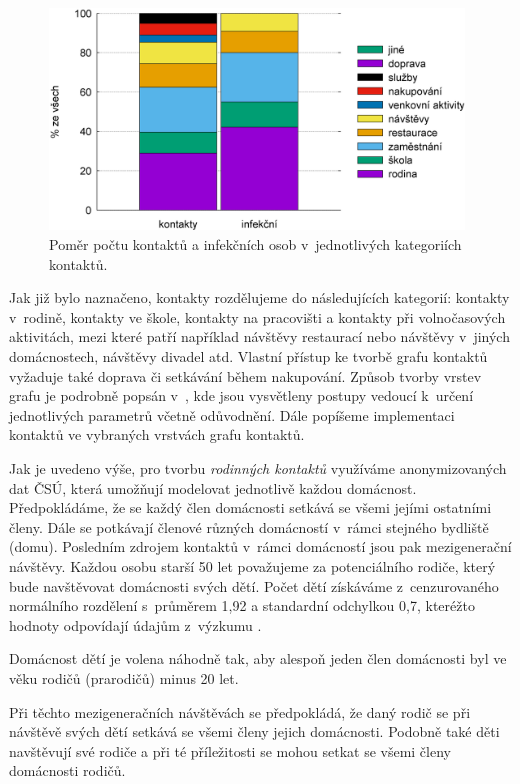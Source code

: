 \begin{figure}
    \centering
    \includegraphics[width=11cm]{pic/filled_cz.eps}
    \caption{Poměr počtu kontaktů a infekčních osob v~jednotlivých kategoriích kontaktů.}
    \label{kategorie}
\end{figure}

Jak již bylo naznačeno, kontakty rozdělujeme do následujících kategorií: kontakty v~rodině, kontakty ve škole, kontakty na pracovišti a kontakty při volnočasových aktivitách, mezi které patří například návštěvy restaurací nebo návštěvy v~jiných domácnostech, návštěvy divadel atd. Vlastní přístup ke tvorbě grafu kontaktů vy\-ža\-du\-je také doprava či setkávání během nakupování. Způsob tvorby vrstev grafu je podrobně popsán v~\cite{M-techrep2021}, kde jsou vysvětleny postupy vedoucí k~určení jednotlivých parametrů včetně odůvodnění. Dále popíšeme implementaci kontaktů ve vybraných vrstvách grafu kontaktů.

Jak je uvedeno výše, pro tvorbu \emph{rodinných kontaktů} využíváme anonymizovaných dat ČSÚ, která umožňují modelovat jednotlivě každou domácnost. Předpokládáme, že se každý člen domácnosti setkává se všemi jejími ostatními členy. Dále se potkávají členové různých domácností v~rámci stejného bydliště (domu). Posledním zdrojem kontaktů v~rámci domácností jsou pak mezigenerační návštěvy.
Každou osobu starší 50 let považujeme za potenciálního rodiče, který bude navštěvovat domácnosti svých dětí. Počet dětí získáváme z~cenzurovaného normálního rozdělení s~průměrem 1,92 a standardní odchylkou 0,7, kteréžto hodnoty odpovídají údajům z~výzkumu \cite{zaj:ess}.

Domácnost dětí je volena náhodně tak, aby alespoň jeden člen domácnosti byl ve věku rodičů (prarodičů) minus 20 let.

Při těchto mezigeneračních návštěvách se předpokládá, že daný rodič se při návštěvě svých dětí setkává se všemi členy jejich domácnosti. Podobně také děti navštěvují své rodiče a při té příležitosti se mohou setkat se všemi členy domácnosti rodičů.

